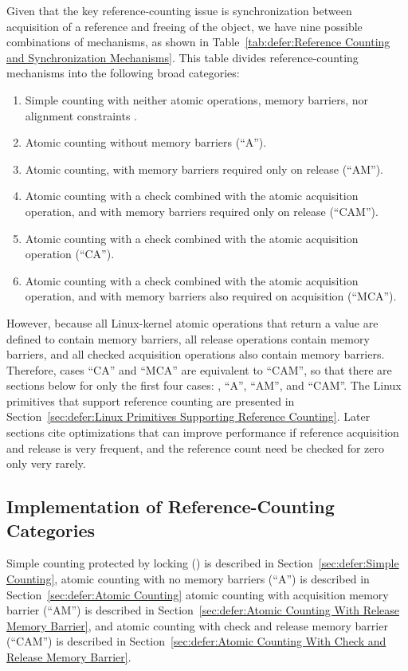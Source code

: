 Given that the key reference-counting issue
is synchronization between acquisition
of a reference and freeing of the object, we have nine possible
combinations of mechanisms, as shown in
Table~\ref{tab:defer:Reference Counting and Synchronization Mechanisms}.
This table
divides reference-counting mechanisms into the following broad categories:
\begin{enumerate}
\item	Simple counting with neither atomic operations, memory
	barriers, nor alignment constraints .
\item	Atomic counting without memory barriers (``A'').
\item	Atomic counting, with memory barriers required only on release
	(``AM'').
\item	Atomic counting with a check combined with the atomic acquisition
	operation, and with memory barriers required only on release
	(``CAM'').
\item	Atomic counting with a check combined with the atomic acquisition
	operation (``CA'').
\item	Atomic counting with a check combined with the atomic acquisition
	operation, and with memory barriers also required on acquisition
	(``MCA'').
\end{enumerate}
However, because all Linux-kernel atomic operations that return a
value are defined to contain memory barriers, all release operations
contain memory barriers, and all checked acquisition operations also
contain memory barriers.
Therefore, cases ``CA'' and ``MCA'' are equivalent to ``CAM'', so that
there are sections below for only the first four cases:
, ``A'', ``AM'', and ``CAM''.
The Linux primitives that support reference counting are presented in
Section~\ref{sec:defer:Linux Primitives Supporting Reference Counting}.
Later sections cite optimizations that can improve performance
if reference acquisition and release is very frequent, and the
reference count need be checked for zero only very rarely.

\subsection{Implementation of Reference-Counting Categories}
\label{sec:defer:Implementation of Reference-Counting Categories}

Simple counting protected by locking () is described in
Section~\ref{sec:defer:Simple Counting},
atomic counting with no memory barriers (``A'') is described in
Section~\ref{sec:defer:Atomic Counting}
atomic counting with acquisition memory barrier (``AM'') is described in
Section~\ref{sec:defer:Atomic Counting With Release Memory Barrier},
and
atomic counting with check and release memory barrier (``CAM'') is described in
Section~\ref{sec:defer:Atomic Counting With Check and Release Memory Barrier}.

